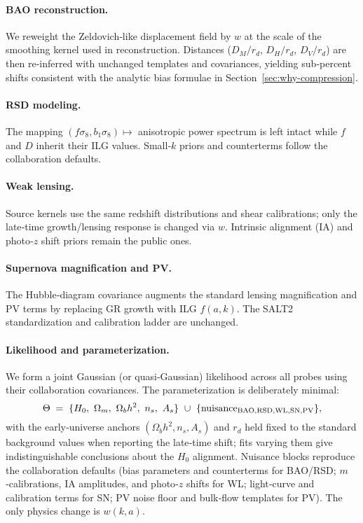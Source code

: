 \documentclass[11pt]{article}
\begin{document}
\paragraph{BAO reconstruction.}
We reweight the Zeldovich‑like displacement field by $w$ at the scale of the smoothing kernel used in reconstruction. Distances ($D_M/r_d$, $D_H/r_d$, $D_V/r_d$) are then re‑inferred with unchanged templates and covariances, yielding sub‑percent shifts consistent with the analytic bias formulae in Section~\ref{sec:why-compression}.

\paragraph{RSD modeling.}
The mapping $(f\sigma_8,b_1\sigma_8)\mapsto$ anisotropic power spectrum is left intact while $f$ and $D$ inherit their ILG values. Small‑$k$ priors and counterterms follow the collaboration defaults.

\paragraph{Weak lensing.}
Source kernels use the same redshift distributions and shear calibrations; only the late‑time growth/lensing response is changed via $w$. Intrinsic alignment (IA) and photo‑$z$ shift priors remain the public ones.

\paragraph{Supernova magnification and PV.}
The Hubble‑diagram covariance augments the standard lensing magnification and PV terms by replacing GR growth with ILG $f(a,k)$. The SALT2 standardization and calibration ladder are unchanged.

\paragraph{Likelihood and parameterization.}
We form a joint Gaussian (or quasi‑Gaussian) likelihood across all probes using their collaboration covariances. The parameterization is deliberately minimal:
\[
\Theta \;=\; \{H_0,\ \Omega_m,\ \Omega_b h^2,\ n_s,\ A_s\}\ \cup\ \{\text{nuisance}_{\rm BAO,RSD,WL,SN,PV}\},
\]
with the early‑universe anchors $(\Omega_b h^2,n_s,A_s)$ and $r_d$ held fixed to the standard background values when reporting the late‑time shift; fits varying them give indistinguishable conclusions about the $H_0$ alignment. Nuisance blocks reproduce the collaboration defaults (bias parameters and counterterms for BAO/RSD; $m$‑calibrations, IA amplitudes, and photo‑$z$ shifts for WL; light‑curve and calibration terms for SN; PV noise floor and bulk‑flow templates for PV). The only physics change is $w(k,a)$.
\end{document}
